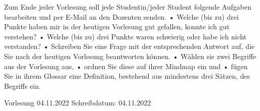 Zum Ende jeder Vorlesung soll jede Studentin/jeder Student folgende Aufgaben
bearbeiten und per E-Mail an den Dozenten senden.
• Welche (bis zu) drei Punkte haben mir in der heutigen Vorlesung gut gefallen,
konnte ich gut verstehen?
• Welche (bis zu) drei Punkte waren schwierig oder habe ich nicht verstanden?
• Schreiben Sie eine Frage mit der entsprechenden Antwort auf, die Sie nach der
heutigen Vorlesung beantworten können.
• Wählen sie zwei Begriffe aus der Vorlesung aus,
• ordnen Sie diese auf ihrer Mindmap ein und
• fügen Sie in ihrem Glossar eine Definition, bestehend aus mindestens drei Sätzen,
des Begriffs ein.

Vorlesung 04.11.2022 Schreibdatum: 04.11.2022
